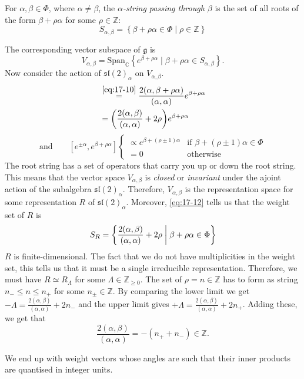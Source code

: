 \begin{definition}[]
  For $\alpha, \beta \in \Phi$, where $\alpha \neq \beta$, the \emph{$\alpha$-string passing through $\beta$} is the set of all roots of the form $\beta + \rho {\alpha}$ for some $\rho \in \mathbb{Z}$:
  \begin{equation}
    S_{\alpha, \beta} = \left\{ \beta + \rho \alpha \in \Phi \mid \rho \in \mathbb{Z} \right\}
  \end{equation}
\end{definition}
The corresponding vector subspace of $\mathfrak{g}$ is
\begin{equation}
  V_{\alpha, \beta} = \text{Span}_{\mathbb{C}}\left\{ e^{\beta + \rho \alpha} \mid \beta + \rho \alpha \in S_{\alpha, \beta}\right\}.
\end{equation}
Now consider the action of $\mathfrak{sl}(2)_{\alpha}$ on $V_{\alpha, \beta}$.
\begin{align}
  [h^{\alpha}, e^{\beta + \rho \alpha}] &\stackrel{\eqref{eq:17-10}}{=} \frac{2 (\alpha, \beta + \rho \alpha)}{(\alpha, \alpha)} e^{\beta + \rho \alpha} \\
								      &= \qty( \frac{2 (\alpha, \beta)}{(\alpha, \alpha)} + 2 \rho) e^{\beta + \rho \alpha} \label{eq:17-12}
\end{align}
\begin{equation}
  \text{and} \qquad [e^{\pm \alpha}, e^{\beta + \rho \alpha}] 
  \begin{cases}
    \propto e^{\beta + (\rho  \pm 1)\alpha} & \text{if } \beta + (\rho \pm 1) \alpha \in \Phi \\
    = 0 &  \text{otherwise}
  \end{cases}
\end{equation}
The root string has a set of operators that carry you up or down the root string. 
This means that the vector space $V_{\alpha, \beta}$ is \emph{closed} or \emph{invariant} under the ajoint action of the subalgebra $\mathfrak{sl}(2)_{\alpha}$.
Therefore, $V_{\alpha, \beta}$ is the representation space for some representation $R$ of $\mathfrak{sl}(2)_{\alpha}$. 
Moreover, \eqref{eq:17-12} tells us that the weight set of $R$ is
\begin{equation}
  S_R = \left\{ \frac{2 (\alpha, \beta)}{(\alpha ,\alpha)} + 2 \rho \suchthat \beta + \rho \alpha \in \Phi \right\}
\end{equation}
$R$ is finite-dimensional. The fact that we do not have multiplicities in the weight set, this tells us that it must be a single irreducible representation.
Therefore, we must have $R \simeq R_{\Lambda}$ for some $\Lambda \in \mathbb{Z}_{\geq 0}$.
The set of $\rho = n \in \mathbb{Z}$ has to form as string $n_{-} \leq n \leq n_{+}$ for some $n_{\pm} \in \mathbb{Z}$. By comparing the lower limit we get $-\Lambda = \frac{2 (\alpha, \beta)}{(\alpha, \alpha)} + 2 n_{-}$ and the upper limit gives $+\Lambda = \frac{2 (\alpha, \beta)}{(\alpha, \alpha)} + 2 n_{+}$. Adding these, we get that
\begin{equation}
  \label{eq:17-15}
  \frac{2 (\alpha, \beta)}{(\alpha, \alpha)} = -(n_{+}+ n_{-}) \in \mathbb{Z}.
\end{equation}

We end up with weight vectors whose angles are such that their inner products are quantised in integer units.
